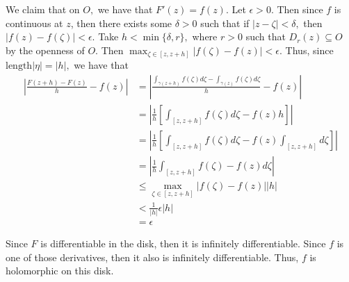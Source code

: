 \documentclass[11pt]{article}
\begin{document}
\begin{solution}
    
    We claim that on $O,$ we have that $F'(z) = f(z).$ Let $\epsilon>0.$ Then since $f$ is continuous at $z$, then there exists some $\delta>0$ such that if $|z - \zeta| < \delta,$ then $|f(z) - f(\zeta)|< \epsilon.$ Take $h<\min\{\delta, r\},$ where $r>0$ such that $D_r(z)\subseteq O$ by the openness of $O.$ Then $\max_{\zeta \in [z, z+ h]}|f(\zeta) - f(z)| < \epsilon.$ Thus, since $\text{length}|\eta| = |h|,$ we have that
\begin{align*}
    \left|\frac{F(z + h) - F(z)}{h} - f(z)\right| &= \left| \frac{\int_{\gamma(z +h)}f(\zeta)d\zeta - \int_{\gamma(z)} f(\zeta)d\zeta}{h} - f(z)\right|\\
    &= \left| \frac{1}{h} \left[ \int_{[z, z + h]}f(\zeta)d\zeta - f(z)h \right]\right|\\
    &= \left|\frac{1}{h}\left[\int_{[z, z + h]}f(\zeta)d\zeta - f(z)\int_{[z, z + h]} d\zeta\right]\right|\\
    &= \left|\frac{1}{h}\int_{[z, z + h]}f(\zeta) - f(z)d\zeta\right|\\
    &\leq \max_{\zeta \in [z, z+ h]}|f(\zeta) - f(z)| |h|\\
    &< \frac{1}{|h|}\epsilon |h|\\
    &= \epsilon
\end{align*}

Since $F$ is differentiable in the disk, then it is infinitely differentiable. Since $f$ is one of those derivatives, then it also is infinitely differentiable. Thus, $f$ is holomorphic on this disk.
\end{solution}
\end{document}
